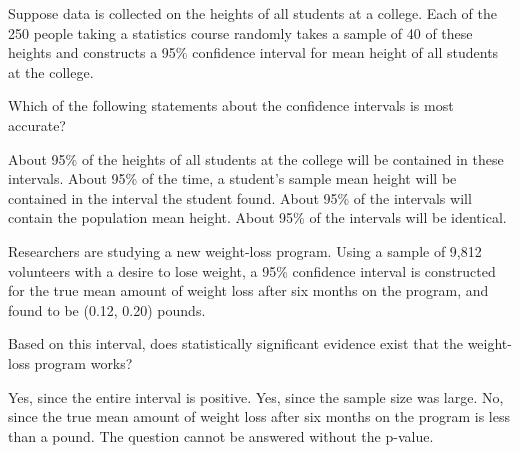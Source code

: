 \documentclass{article}
\begin{document}
\begin{mcquestions}
		\question Suppose data is collected on the heights of all students at a college.  Each of the 250 people taking a statistics course randomly takes a sample of 40 of these heights and constructs a 95\% confidence interval for mean height of all students at the college.
		
		Which of the following statements about the confidence intervals is most accurate?
		\begin{mcanswerslist}
			\answer About 95\% of the heights of all students at the college will be contained in these intervals.
			\answer About 95\% of the time, a student's sample mean height will be contained in the interval the student found.
			\answer[correct] About 95\% of the intervals will contain the population mean height.
			\answer About 95\% of the intervals will be identical.
		\end{mcanswerslist}
		
		\question Researchers are studying a new weight-loss program. Using a sample of 9,812 volunteers with a desire to lose weight, a 95\% confidence interval is constructed for the true mean amount of weight loss after six months on the program, and found to be (0.12, 0.20) pounds.
		
		Based on this interval, does statistically significant evidence exist that the weight-loss program works?
		\begin{mcanswerslist}
			\answer[correct] Yes, since the entire interval is positive.
			\answer Yes, since the sample size was large.
			\answer No, since the true mean amount of weight loss after six months on the program is less than a pound.
			\answer The question cannot be answered without the p-value.
		\end{mcanswerslist}
	\end{mcquestions}
\end{document}
